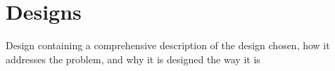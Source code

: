 \section{Designs}


{\color{red} Design containing a comprehensive description of the design chosen, how it addresses the problem, and why it is designed the way it is}